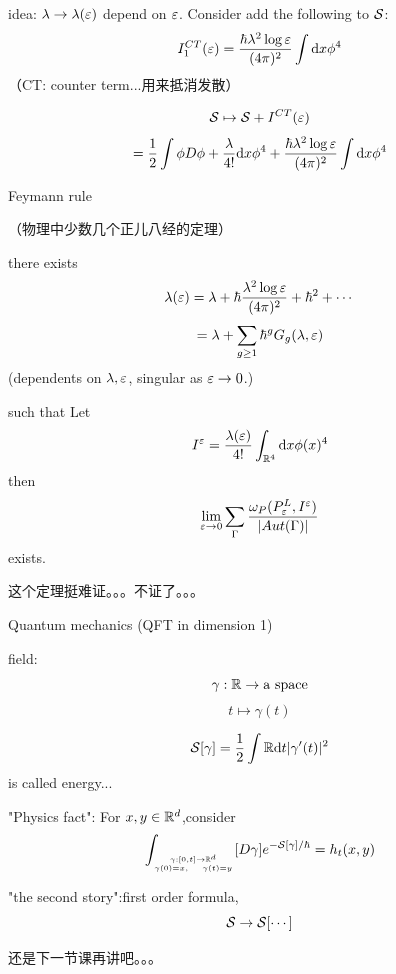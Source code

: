 idea: $\lambda\to\lambda(\varepsilon)$ depend on $\varepsilon$.
Consider add the following to $\mathcal{S}$:
$$I^{CT}_1(\varepsilon)=\frac{\hbar\lambda^2\log\varepsilon}{(4\pi)^2}\int\mathrm{d} x\phi^4$$
（CT: counter term...用来抵消发散）

$$\mathcal{S}\mapsto\mathcal{S}+I^{CT}(\varepsilon)$$
$$=\frac{1}{2}\int\phi D\phi+\frac{\lambda}{4!}\mathrm{d} x\phi^4+
\frac{\hbar\lambda^2\log\varepsilon}{(4\pi)^2}\int\mathrm{d} x\phi^4$$

Feymann rule

\begin{thm}[Physics]（物理中少数几个正儿八经的定理）

there exists 
$$\lambda(\varepsilon)=\lambda+\hbar\frac{\lambda^2\log\varepsilon}{(4\pi)^2}+\hbar^2+\cdots$$
$$=\lambda+\sum_{g\geq 1}\hbar^gG_g(\lambda,\varepsilon)$$
(dependents on $\lambda,\varepsilon$, singular as $\varepsilon\to 0$.)

such that Let 
$$I^{\varepsilon}=\frac{\lambda(\varepsilon)}{4!}\int_{\mathbb{R}^4}\mathrm{d} x\phi(x)^4$$
then
$$
  \lim_{\varepsilon\to 0}\sum_{\Gamma}
  \frac{\omega_P(P_\varepsilon^L,I^\varepsilon)}
       {|Aut(\Gamma)|}
$$
exists.
\end{thm}

这个定理挺难证。。。不证了。。。

\begin{example}Quantum mechanics (QFT in dimension 1)

field:
$$\gamma:\mathbb{R}\to\text{a space}$$
$$t\mapsto \gamma(t)$$

$$\mathcal{S}[\gamma]=\frac{1}{2}\int\mathbb{R}\mathrm{d} t|\gamma'(t)|^2$$
is called energy...

\end{example}

"Physics fact": For $x,y\in\mathbb{R}^d$,consider
$$\int_{\gamma:[0,t]\to\mathbb{R}^d\atop\gamma(0)=x,\quad\gamma(t)=y}
[D\gamma]e^{-\mathcal{S}[\gamma]/\hbar}
=h_t(x,y)$$

"the second story":first order formula,
$$\mathcal{S}\to\mathcal{S}[\cdots]$$

还是下一节课再讲吧。。。






